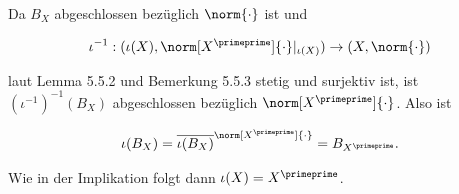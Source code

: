 \begin{solution}
\begin{itemize}

  Da $B_X$ abgeschlossen bezüglich $\norm{\cdot}$ ist und

  \begin{align*}
    \iota^{-1}:
    (\iota(X), \norm[X^\primeprime]{\cdot}|_{\iota(X)})
    \to
    (X, \norm{\cdot})
  \end{align*}

  laut Lemma 5.5.2 und Bemerkung 5.5.3 stetig und surjektiv ist, ist $(\iota^{-1})^{-1}(B_X)$ abgeschlossen bezüglich $\norm[X^\primeprime]{\cdot}$.
  Also ist

  \begin{align*}
    \iota(B_X)
    =
    \overline{\iota(B_X)}^{\norm[X^\primeprime]{\cdot}}
    =
    B_{X^\primeprime}.
  \end{align*}

  Wie in der Implikation  folgt dann $\iota(X) = X^\primeprime$.

\end{itemize}

\end{solution}
